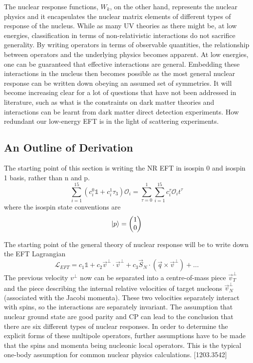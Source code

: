 \documentclass[12pt]{article}
\begin{document}
The nuclear response functions, $W_k$, on the other hand, represents the nuclear physics and it encapsulates the nuclear matrix elements of different types of response of the nucleus. While as many UV theories as there might be, at low energies, classification in terms of non-relativistic interactions do not sacrifice generality. By writing operators in terms of observable quantities, the relationship between operators and the underlying physics becomes apparent. At low energies, one can be guaranteed that effective interactions are general. Embedding these interactions in the nucleus then becomes possible as the most general nuclear response can be written down obeying an assumed set of symmetries. It will become increasing clear for a lot of questions that have not been addressed in literature, such as what is the constraints on dark matter theories and interactions can be learnt from dark matter direct detection experiments. How redundant our low-energy EFT is in the light of scattering experiments. 


\subsection{An Outline of Derivation}
The starting point of this section is writing the NR EFT in isospin 0 and isospin 1 basis, rather than n and p. 
$$
\sum_{i=1}^{15}(c_i^0 \mathbb 1 + c_i^1 \tau_3) \mathcal O_i = \sum_{\tau=0}^1\sum_{i=1}^{15}c_i^\tau \mathcal O_i t^\tau
$$
where the isospin state conventions are 
$$
\ket p = \begin{pmatrix} 1\\ 0 \end{pmatrix}
$$




The starting point of the general theory of nuclear response will be to write down the EFT Lagrangian 
$$
\mathcal L_{EFT} = c_1 \mathbb 1 + c_2 \vec v^\bot \cdot \vec v^\bot + c_3 \vec S_N \cdot (\vec q \times \vec v^\bot) + ...
$$
The previous velocity $v^\bot$ now can be separated into a centre-of-mass piece $\vec v_T ^\bot $ and the piece describing the internal relative velocities of target nucleons $\vec v_N^\bot$ (associated with the Jacobi momenta). These two velocities separately interact with spins, so the interactions are separately invariant. The assumption that nuclear ground state are good parity and CP can lead to the conclusion that there are six different types of nuclear responses. In order to determine the explicit forms of these multipole operators, further assumptions have to be made that the spins and momenta being nucleonic local operators. This is the typical one-body assumption for common nuclear physics calculations. [1203.3542] 
\end{document}
